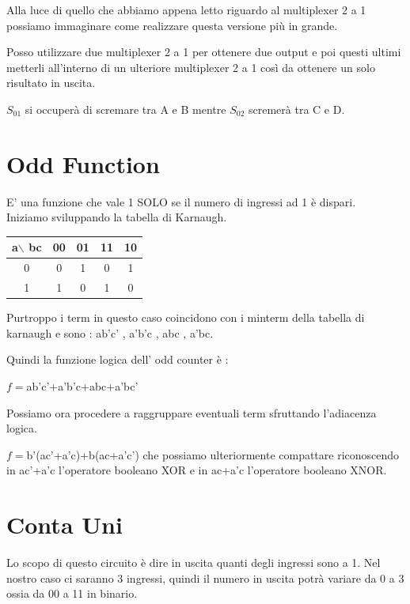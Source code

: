\documentclass[a4paper]{book}
\begin{document}
Alla luce di quello che abbiamo appena letto riguardo al multiplexer 2 a 1 possiamo immaginare come realizzare questa versione più in grande.

Posso utilizzare due multiplexer 2 a 1 per ottenere due output e poi questi ultimi metterli all'interno di un ulteriore multiplexer 2 a 1 così da ottenere un solo risultato in uscita.

\(S_01 \) si occuperà di scremare tra A e B mentre \(S_02 \) scremerà tra C e D.


\section{Odd Function}

E' una funzione che vale 1 SOLO se il numero di ingressi ad 1 è dispari.\\
Iniziamo sviluppando la tabella di Karnaugh.\\

\vspace{\baselineskip}

\begin{tabular}{|c|c|c|c|c|}
\hline
a$\backslash$ bc & 00 & 01 & 11 & 10 \\
\hline
0              & 0  &  \cellcolor{yellow}1 & 0  & \cellcolor{yellow}1  \\
\hline
1              & \cellcolor{yellow}1  &  0 & \cellcolor{yellow}1  & 0  \\
\hline
\end{tabular}
\vspace{\baselineskip}

Purtroppo i term in questo caso coincidono con i minterm della tabella di karnaugh e sono : ab'c' , a'b'c , abc , a'bc.

Quindi la funzione logica dell' odd counter è :

\(f=\)ab'c'+a'b'c+abc+a'bc'

Possiamo ora procedere a raggruppare eventuali term sfruttando l'adiacenza logica.

\(f=\)b'(ac'+a'c)+b(ac+a'c') che possiamo ulteriormente compattare riconoscendo in ac'+a'c l'operatore booleano XOR e in ac+a'c l'operatore booleano XNOR.




\section{Conta Uni}

Lo scopo di questo circuito è dire in uscita quanti degli ingressi sono a 1. Nel nostro caso ci saranno 3 ingressi, quindi il numero in uscita potrà variare da 0 a 3 ossia da 00 a 11 in binario.
\end{document}
